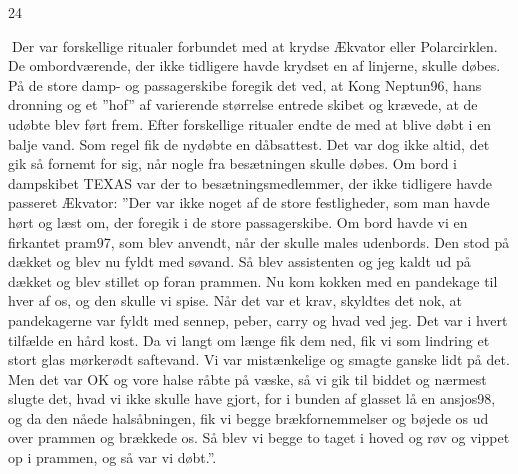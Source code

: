 24

Der var forskellige ritualer forbundet med at krydse Ækvator eller
Polarcirklen. De ombordværende, der ikke tidligere havde krydset en af
linjerne, skulle døbes. På de store damp- og passagerskibe foregik det
ved, at Kong Neptun96, hans dronning og et ''hof'' af varierende
størrelse entrede skibet og krævede, at de udøbte blev ført frem. Efter
forskellige ritualer endte de med at blive døbt i en balje vand. Som
regel fik de nydøbte en dåbsattest. Det var dog ikke altid, det gik så
fornemt for sig, når nogle fra besætningen skulle døbes. Om bord i
dampskibet TEXAS var der to besætningsmedlemmer, der ikke tidligere
havde passeret Ækvator: ''Der var ikke noget af de store festligheder,
som man havde hørt og læst om, der foregik i de store passagerskibe. Om
bord havde vi en firkantet pram97, som blev anvendt, når der skulle
males udenbords. Den stod på dækket og blev nu fyldt med søvand. Så blev
assistenten og jeg kaldt ud på dækket og blev stillet op foran prammen.
Nu kom kokken med en pandekage til hver af os, og den skulle vi spise.
Når det var et krav, skyldtes det nok, at pandekagerne var fyldt med
sennep, peber, carry og hvad ved jeg. Det var i hvert tilfælde en hård
kost. Da vi langt om længe fik dem ned, fik vi som lindring et stort
glas mørkerødt saftevand. Vi var mistænkelige og smagte ganske lidt på
det. Men det var OK og vore halse råbte på væske, så vi gik til biddet
og nærmest slugte det, hvad vi ikke skulle have gjort, for i bunden af
glasset lå en ansjos98, og da den nåede halsåbningen, fik vi begge
brækfornemmelser og bøjede os ud over prammen og brækkede os. Så blev vi
begge to taget i hoved og røv og vippet op i prammen, og så var vi
døbt.''.
